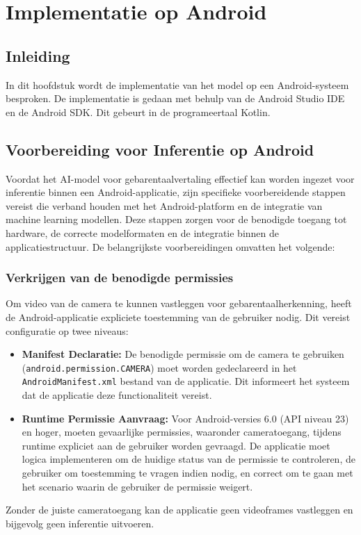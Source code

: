 \chapter{Implementatie op Android}
\label{ch:androidSysteem}
\section{Inleiding}
\label{sec:inleiding-android}
In dit hoofdstuk wordt de implementatie van het model op een Android-systeem besproken.
De implementatie is gedaan met behulp van de Android Studio IDE en de Android SDK.
Dit gebeurt in de programeertaal Kotlin.

\section{Voorbereiding voor Inferentie op Android}
\label{sec:voorbereiding-android-inferentie}

Voordat het AI-model voor gebarentaalvertaling effectief kan worden ingezet voor inferentie binnen een Android-applicatie, zijn specifieke voorbereidende stappen vereist die verband houden met het Android-platform en de integratie van machine learning modellen. 
Deze stappen zorgen voor de benodigde toegang tot hardware, de correcte modelformaten en de integratie binnen de applicatiestructuur. 
De belangrijkste voorbereidingen omvatten het volgende:

\subsection{Verkrijgen van de benodigde permissies}
\label{subsec:permissies-aanvragen}

Om video van de camera te kunnen vastleggen voor gebarentaalherkenning, heeft de Android-applicatie expliciete toestemming van de gebruiker nodig. 
Dit vereist configuratie op twee niveaus:
\begin{itemize}
    \item \textbf{Manifest Declaratie:} De benodigde permissie om de camera te gebruiken (\texttt{android.permission.CAMERA}) moet worden gedeclareerd in het \texttt{AndroidManifest.xml} bestand van de applicatie. 
    Dit informeert het systeem dat de applicatie deze functionaliteit vereist.
    \item \textbf{Runtime Permissie Aanvraag:} Voor Android-versies 6.0 (API niveau 23) en hoger, moeten gevaarlijke permissies, waaronder cameratoegang, tijdens runtime expliciet aan de gebruiker worden gevraagd. 
    De applicatie moet logica implementeren om de huidige status van de permissie te controleren, de gebruiker om toestemming te vragen indien nodig, en correct om te gaan met het scenario waarin de gebruiker de permissie weigert.
\end{itemize}
Zonder de juiste cameratoegang kan de applicatie geen videoframes vastleggen en bijgevolg geen inferentie uitvoeren.

